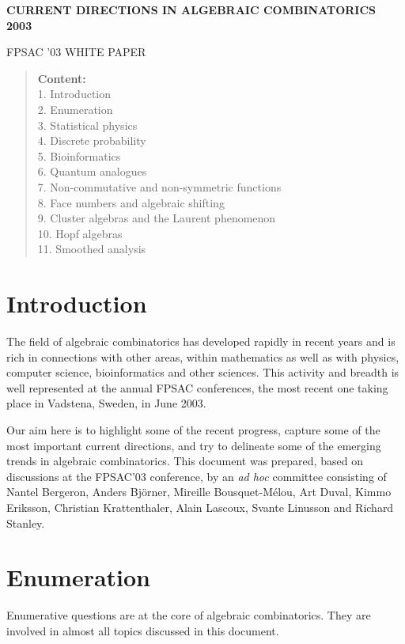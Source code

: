 \documentclass{amsart}
\begin{document}
\begin{center}
\Large {\bf CURRENT DIRECTIONS IN ALGEBRAIC COMBINATORICS 2003}
\medskip

\large FPSAC '03 WHITE PAPER 
\end{center}
\vspace{.6cm}

\begin{verse}
{\bf Content:}\\
1. Introduction\\
2. Enumeration\\
3. Statistical physics\\
4. Discrete probability\\
5. Bioinformatics\\
6. Quantum analogues\\
7. Non-commutative and non-symmetric functions\\
8. Face numbers and algebraic shifting\\
9. Cluster algebras and the Laurent phenomenon\\
10. Hopf algebras\\
11. Smoothed analysis
\end{verse}

\section{Introduction}
The field of algebraic combinatorics has developed rapidly in recent years
and is rich in connections with other areas,
within mathematics as well as with physics, computer science, bioinformatics and
other sciences. This activity and breadth is well represented at the annual FPSAC conferences, 
the most recent one taking place in Vadstena, Sweden, in June 2003.

Our aim here is to highlight some of the recent progress, capture some of the most important
current directions, and try to delineate some of the emerging trends in algebraic combinatorics.
This document was prepared, based on discussions at the FPSAC'03 conference, by an 
{\em ad hoc} committee consisting of Nantel Bergeron, Anders Bj\"orner, Mireille Bousquet-M\'elou, 
Art Duval, Kimmo Eriksson, Christian Krattenthaler, Alain Lascoux, Svante Linusson 
and Richard Stanley.


\section{Enumeration} Enumerative questions are at the core of algebraic combinatorics.
They are involved in almost all topics discussed in  this document.
\end{document}
